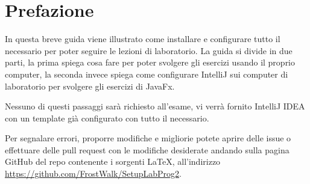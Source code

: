 \section*{Prefazione}
    In questa breve guida viene illustrato come installare e configurare tutto il necessario per poter seguire le lezioni di laboratorio.
    La guida si divide in due parti, la prima spiega cosa fare per poter svolgere gli esercizi usando il proprio computer, la seconda invece
    spiega come configurare IntelliJ sui computer di laboratorio per svolgere gli esercizi di JavaFx.
    \begin{warningbox}
        Nessuno di questi passaggi sarà richiesto all'esame, vi verrà fornito IntelliJ IDEA con un template già configurato con tutto il necessario.
    \end{warningbox}
    
    Per segnalare errori, proporre modifiche e migliorie potete aprire delle issue o effettuare delle pull request con le modifiche desiderate andando 
    sulla pagina GitHub del repo contenente i sorgenti LaTeX, all'indirizzo \url{https://github.com/FrostWalk/SetupLabProg2}.